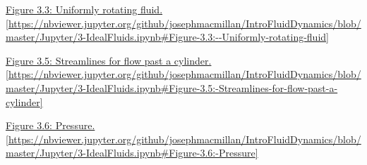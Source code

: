 \vspace{0.1in}

\noindent \href{https://nbviewer.jupyter.org/github/josephmacmillan/IntroFluidDynamics/blob/master/Jupyter/3-IdealFluids.ipynb#Figure-3.3:--Uniformly-rotating-fluid}{Figure 3.3: Uniformly rotating fluid. [\url{https://nbviewer.jupyter.org/github/josephmacmillan/IntroFluidDynamics/blob/master/Jupyter/3-IdealFluids.ipynb\#Figure-3.3:--Uniformly-rotating-fluid}]}

\vspace{0.1in}

\noindent \href{https://nbviewer.jupyter.org/github/josephmacmillan/IntroFluidDynamics/blob/master/Jupyter/3-IdealFluids.ipynb#Figure-3.5:-Streamlines-for-flow-past-a-cylinder}{Figure 3.5: Streamlines for flow past a cylinder. [\url{https://nbviewer.jupyter.org/github/josephmacmillan/IntroFluidDynamics/blob/master/Jupyter/3-IdealFluids.ipynb\#Figure-3.5:-Streamlines-for-flow-past-a-cylinder}]}

\vspace{0.1in}

\noindent \href{https://nbviewer.jupyter.org/github/josephmacmillan/IntroFluidDynamics/blob/master/Jupyter/3-IdealFluids.ipynb#Figure-3.6:-Pressure}{Figure 3.6: Pressure. [\url{https://nbviewer.jupyter.org/github/josephmacmillan/IntroFluidDynamics/blob/master/Jupyter/3-IdealFluids.ipynb\#Figure-3.6:-Pressure}]}





